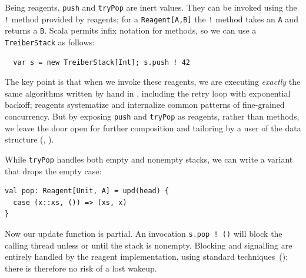 \documentclass[preprint]{sigplanconf}
\begin{document}
Being reagents, \lstinline{push} and \lstinline{tryPop} are inert values.
They can be invoked using the \lstinline{!} method provided by reagents; for a
\lstinline{Reagent[A,B]} the \lstinline{!} method takes an \lstinline{A} and
returns a \lstinline{B}.  Scala permits infix notation for methods, so we can
use a \lstinline{TreiberStack} as follows:
\begin{lstlisting}
  var s = new TreiberStack[Int]; s.push ! 42
\end{lstlisting}
The key point is that when we invoke these reagents, we are executing
\emph{exactly} the same algorithms written by hand in ,
including the retry loop with exponential backoff; reagents systematize and
internalize common patterns of fine-grained concurrency.  But by exposing
\lstinline{push} and \lstinline{tryPop} as reagents, rather than methods, we
leave the door open for further composition and tailoring by a user of the
data structure (, ).

While \lstinline{tryPop} handles both empty and nonempty stacks, we
can write a variant that drops the empty case:
\begin{lstlisting}
val pop: Reagent[Unit, A] = upd(head) {
  case (x::xs, ()) => (xs, x)
}
\end{lstlisting}
Now our update function is partial.  An invocation \lstinline{s.pop ! ()} will
block the calling thread unless or until the stack is nonempty.  Blocking and
signalling are entirely handled by the reagent implementation, using standard
techniques~(); there is therefore no risk of a lost
wakeup.  %


\end{document}
